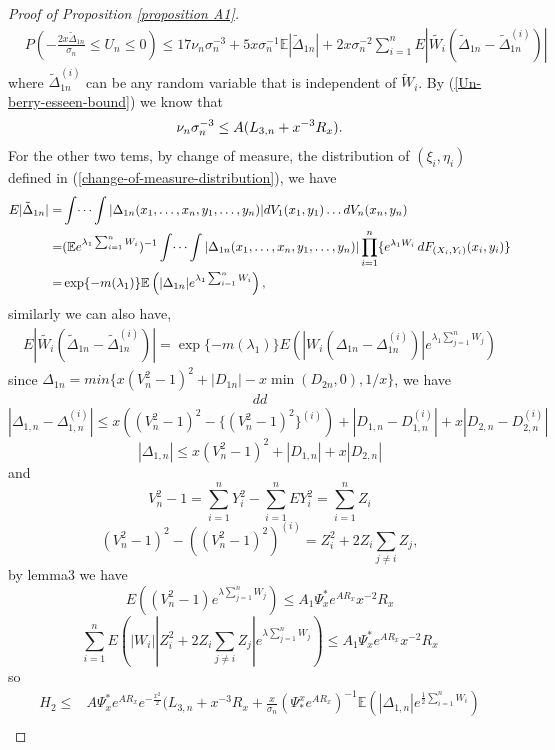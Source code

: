 \documentclass[bj,authoryear]{imsart}
\numberwithin{equation}{section}
\theoremstyle{plain}
\theoremstyle{definition}
\begin{document}
\begin{proof}[Proof of Proposition \ref{proposition A1}]
\begin{align}
  &P\left(-\frac{2x\tilde{\Delta}_{1n}}{\sigma_n}\leq U_n\leq 0\right) \leq 17\nu_n\sigma_{n}^{-3}+5x\sigma_{n}^{-1}\mathbb{E}|\tilde{\Delta}_{1n}|+ 2x\sigma_n^{-2}\sum_{i=1}^{n}E|\tilde{W_i}(\tilde{\Delta}_{1n}-\tilde{\Delta}_{1n}^{(i)})|
\end{align}
where $\tilde{\Delta}_{1n}^{(i)}$ can be any random variable that is independent of $\tilde{W}_{i}$. By (\ref{Un-berry-esseen-bound}) we know that
\begin{align}
  \nu_{n}\sigma_{n}^{-3}\leq A(L_{3,n}+x^{-3}R_x).\notag
\end{align}
For the other two tems, by change of measure, the distribution of $(\xi_{i},\eta_{i})$ defined in (\ref{change-of-measure-distribution}), we have
\begin{align}
  E|\tilde{\Delta}_{1n}| = & \int\dots\int|\Delta_{1n}(x_1,\dots,x_n,y_1,\dots,y_n)|dV_1(x_1,y_1)\dots dV_n(x_n,y_n)\notag\\
  = &(\mathbb{E} e^{\lambda_{1}\sum_{i=1}^{n}W_i})^{-1}\int\dots\int|\Delta_{1n}(x_1,\dots,x_n,y_1,\dots,y_n)|\prod_{i=1}^{n}\{e^{\lambda_{1}W_i}\,dF_{(X_i,Y_i)}(x_i,y_i)\}\notag\\
  =&\exp\{-m(\lambda_{1})\}\mathbb{E}\left(|\Delta_{1n}|e^{\lambda_{1}\sum_{i=1}^{n}W_i}\right),
\end{align}
similarly we can also have,
\begin{align}
  E|\tilde{W_i}(\tilde{\Delta}_{1n}-\tilde{\Delta}_{1n}^{(i)})| = \exp\{-m(\lambda_{1})\}E(|W_i(\Delta_{1n}-\Delta_{1n}^{(i)})|e^{\lambda_{1}\sum_{j=1}^{n}W_j})
\end{align}
since $\Delta_{1n} = min\{x(V_n^2-1)^2+|D_{1n}|-x\min(D_{2n},0),1/x\}$, we have
\begin{align}
  dd
\end{align}
$$|\Delta_{1,n}-\Delta_{1,n}^{(i)}|\leq x((V_n^2-1)^2-\{(V_n^2-1)^2\}^{(i)})+|D_{1,n}-D_{1,n}^{(i)}|+x|D_{2,n}-D_{2,n}^{(i)}|$$
$$|\Delta_{1,n}|\leq x(V_n^2-1)^2+|D_{1,n}|+x|D_{2,n}|$$ and $$V_n^2-1 = \sum_{i=1}^{n}Y_i^2-\sum_{i=1}^{n}EY_i^2 = \sum_{i=1}^{n}Z_i$$ $$(V_n^2-1)^2-((V_n^2-1)^{2})^{(i)} = Z_i^2+2Z_i\sum_{j\neq i}Z_j,$$ by lemma3 we have
$$E((V_n^2-1)e^{\lambda\sum_{j=1}^{n}W_j})\leq A_1\Psi^{*}_{x}e^{AR_x} x^{-2}R_x$$
$$\sum_{i=1}^{n}E(|W_i||Z_i^2+2Z_i\sum_{j\neq i}Z_j|e^{\lambda\sum_{j=1}^{n}W_j})\leq A_1\Psi^{*}_{x}e^{AR_x} x^{-2}R_x$$
so
\begin{equation}
  \begin{aligned}
    H_2 \leq & A\Psi_{x}^{*}e^{AR_x}e^{-\frac{x^2}{2}}(L_{3,n}+x^{-3}R_x+\frac{x}{\sigma_n}(\Psi_{*}^{x}e^{AR_x})^{-1}\mathbb{E}\left(|\Delta_{1,n}|e^{\frac{1}{2}\sum_{i=1}^{n}W_i}\right)\\

\end{aligned}
\end{equation}
\end{proof}
\end{document}
